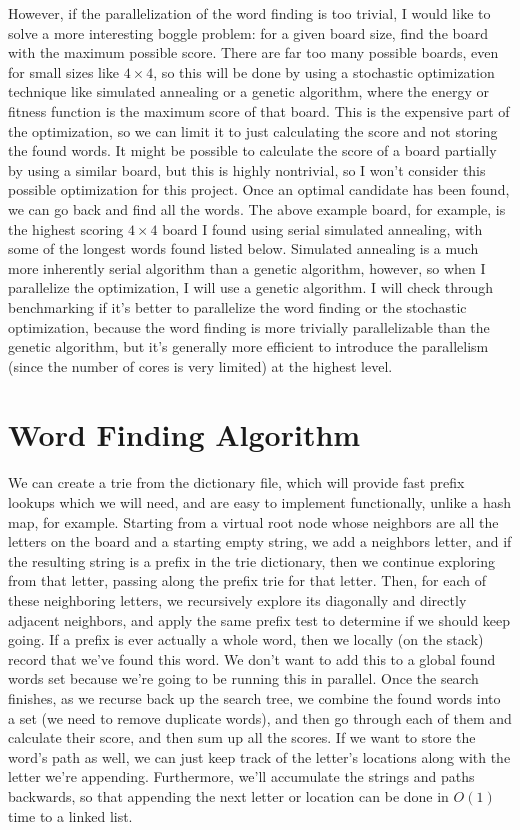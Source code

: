 \documentclass[fleqn]{article}
\begin{document}
    \pagebreak

    However, if the parallelization of the word finding is too trivial, I would like to solve a more interesting boggle problem: for a given board size, find the board with the maximum possible score.  There are far too many possible boards, even for small sizes like $4 \times 4$, so this will be done by using a stochastic optimization technique like simulated annealing or a genetic algorithm, where the energy or fitness function is the maximum score of that board.  This is the expensive part of the optimization, so we can limit it to just calculating the score and not storing the found words.  It might be possible to calculate the score of a board partially by using a similar board, but this is highly nontrivial, so I won't consider this possible optimization for this project.  Once an optimal candidate has been found, we can go back and find all the words.  The above example board, for example, is the highest scoring $4 \times 4$ board I found using serial simulated annealing, with some of the longest words found listed below.  Simulated annealing is a much more inherently serial algorithm than a genetic algorithm, however, so when I parallelize the optimization, I will use a genetic algorithm.  I will check through benchmarking if it's better to parallelize the word finding or the stochastic optimization, because the word finding is more trivially parallelizable than the genetic algorithm, but it's generally more efficient to introduce the parallelism (since the number of cores is very limited) at the highest level.

    \section{Word Finding Algorithm}
    We can create a trie from the dictionary file, which will provide fast prefix lookups which we will need, and are easy to implement functionally, unlike a hash map, for example.  Starting from a virtual root node whose neighbors are all the letters on the board and a starting empty string, we add a neighbors letter, and if the resulting string is a prefix in the trie dictionary, then we continue exploring from that letter, passing along the prefix trie for that letter. Then, for each of these neighboring letters, we recursively explore its diagonally and directly adjacent neighbors, and apply the same prefix test to determine if we should keep going.  If a prefix is ever actually a whole word, then we locally (on the stack) record that we've found this word.  We don't want to add this to a global found words set because we're going to be running this in parallel.  Once the search finishes, as we recurse back up the search tree, we combine the found words into a set (we need to remove duplicate words), and then go through each of them and calculate their score, and then sum up all the scores.  If we want to store the word's path as well, we can just keep track of the letter's locations along with the letter we're appending.  Furthermore, we'll accumulate the strings and paths backwards, so that appending the next letter or location can be done in $O(1)$ time to a linked list.
\end{document}
